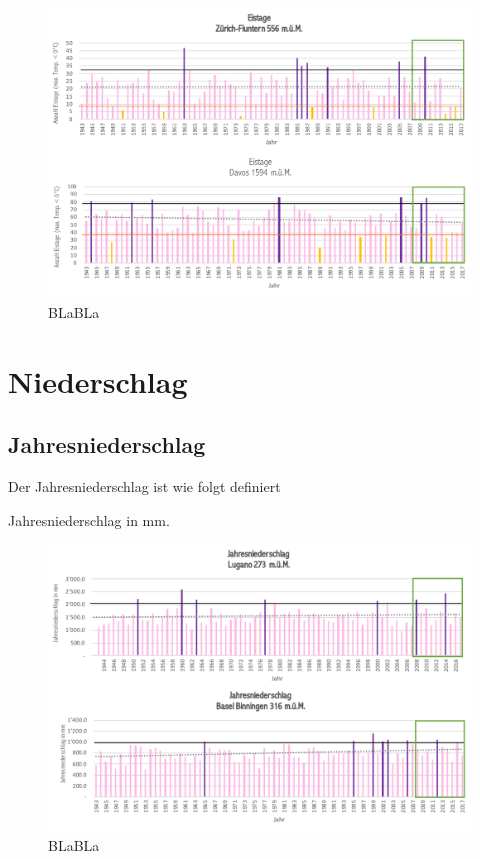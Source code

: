 \begin{refsection}
\begin{figure}[htbp]
\centering
\includegraphics[width=1.0\textwidth]{extrem/Eistage.pdf}
\caption{BLaBLa}
\label{Eistage}
\end{figure}


\section{Niederschlag}


\subsection{Jahresniederschlag}
Der Jahresniederschlag ist wie folgt definiert

\begin{definition}
Jahresniederschlag in mm.
\end{definition}


\begin{figure}[htbp]
\centering
\includegraphics[width=1.0\textwidth]{extrem/Jahresniederschlag.pdf}
\caption{BLaBLa}
\label{Jahresniederschlag}
\end{figure}




\end{refsection}
